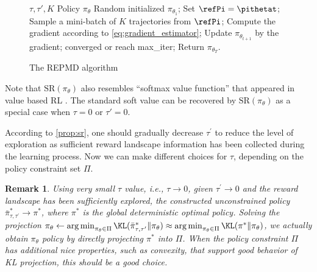 \documentclass{article}
\newtheorem{remk}{Remark}
\DeclareMathOperator*{\argmin}{arg\,min}
\begin{document}
\begin{wrapfigure}{r}{0.5\textwidth}
    \begin{minipage}{0.5\textwidth}
      \begin{algorithm}[H]
  \caption{\label{alg:repmd}  The REPMD algorithm}
 \begin{algorithmic}[1]
  \INPUT $\tau, \tau', K$
  \OUTPUT  Policy $\pi_\theta$
  \STATE Random initialized $\pi_{\theta_1}$;
  \STATE Set $\refPi = \pithetat$;
  \REPEAT 
  \STATE Sample a mini-batch of $K$ trajectories from $\refPi$;
  \STATE Compute the gradient according to \cref{eq:gradient_estimator};
  \STATE Update $\pi_{\theta_{t+1}}$ by the gradient;
  \UNTIL converged or reach max\_iter;
  \ENDFOR
  \STATE Return $\pi_{\theta_T}$.
 \end{algorithmic}
\end{algorithm}
    \end{minipage}
  \end{wrapfigure}
  
Note that $\text{SR}(\pi_\theta)$ also resembles ``softmax value function'' that appeared in value based RL \cite{nachum2017bridging,haarnoja2018soft,NIPS2017_6874}. The standard soft value can be recovered by $\text{SR}(\pi_\theta)$ as a special case when $\tau = 0$ or $\tau'=0$. 

According to \cref{prop:sr}, one should gradually decrease $\tau^{\prime}$ to reduce the level of exploration as sufficient reward landscape information has been collected during the learning process. Now we can make different choices for $\tau$, depending on the policy constraint set $\Pi$.

\begin{remk}
	\label{small_tau_choices}
	Using very small $\tau$ value, i.e., $\tau \to 0$, given $\tau^{\prime} \to 0$ and the reward landscape has been sufficiently explored, the constructed unconstrained policy $\bar{\pi}_{\tau,\tau^{\prime}}^* \to \pi^*$, where $\pi^*$ is the global deterministic optimal policy. Solving the projection $\pi_\theta \leftarrow \argmin_{\pi_\theta \in \Pi}{\KL(\bar{\pi}_{\tau,\tau^{\prime}}^* \| \pi_\theta}) \approx \argmin_{\pi_\theta \in \Pi}{\KL(\pi^* \| \pi_\theta})$, we actually obtain $\pi_\theta$ policy by directly projecting $\pi^*$ into $\Pi$. When the policy constraint $\Pi$ has additional nice properties, such as convexity, that support good behavior of KL projection, this should be a good choice.
\end{remk}
  
\end{document}
